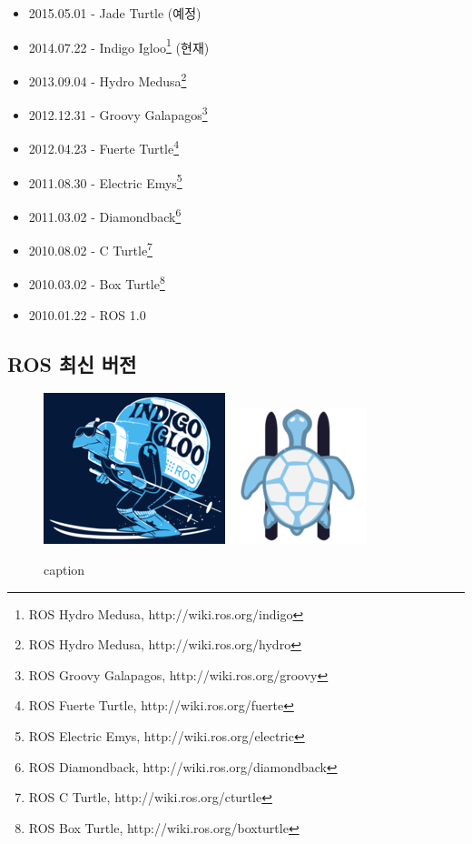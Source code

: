 \begin{itemize}
\item 2015.05.01 - Jade Turtle (예정)
\item 2014.07.22 - Indigo Igloo\footnote{ROS Hydro Medusa, http://wiki.ros.org/indigo} (현재)
\item 2013.09.04 - Hydro Medusa\footnote{ROS Hydro Medusa, http://wiki.ros.org/hydro}
\item 2012.12.31 - Groovy Galapagos\footnote{ROS Groovy Galapagos, http://wiki.ros.org/groovy}
\item 2012.04.23 - Fuerte Turtle\footnote{ROS Fuerte Turtle, http://wiki.ros.org/fuerte}
\item 2011.08.30 - Electric Emys\footnote{ROS Electric Emys, http://wiki.ros.org/electric}
\item 2011.03.02 - Diamondback\footnote{ROS Diamondback, http://wiki.ros.org/diamondback}
\item 2010.08.02 - C Turtle\footnote{ROS C Turtle, http://wiki.ros.org/cturtle}
\item 2010.03.02 - Box Turtle\footnote{ROS Box Turtle, http://wiki.ros.org/boxturtle}
\item 2010.01.22 - ROS 1.0
\end{itemize}

\subsection{ROS 최신 버전}

\begin{figure}[h]
\centering
\includegraphics[width=0.4\columnwidth]{pictures/chapter1/indigo_igloo.png}
\includegraphics[width=0.4\columnwidth]{pictures/chapter1/indigo_igloo_icon.png}
\caption{caption}
\end{figure}

